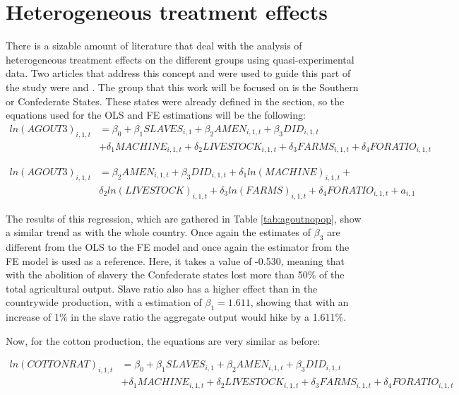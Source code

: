 \documentclass[12pt]{report}
\begin{document}
\section{Heterogeneous treatment effects}
There is a sizable amount of literature that deal with the analysis of heterogeneous treatment effects on the different groups using quasi-experimental data. Two articles that address this concept and were used to guide this part of the study were \cite{felfe2015can} and \cite{NBERw9708}. The group that this work will be focused on is the Southern or Confederate States. These states were already defined in the  section, so the equations used for the OLS and FE estimations will be the following:
\begin{equation}
\begin{split}
ln(AGOUT3)_{i,1,t} &=\beta_{0}+\beta_{1}SLAVES_{i,1}+\beta_{2}AMEN_{i,1,t}+\beta_{3}DID_{i,1,t}
\\
&+\delta_{1}MACHINE_{i,1,t}+\delta_{2}LIVESTOCK_{i,1,t}+\delta_{3}FARMS_{i,1,t}+\delta_{4}FORATIO_{i,1,t}
\end{split}
\end{equation}

\begin{equation}
\begin{split}
ln(AGOUT3)_{i,1,t} &=\beta_{2}AMEN_{i,1,t}+\beta_{3}DID_{i,1,t}+\delta_{1}ln(MACHINE)_{i,1,t}+
\\
&\delta_{2}ln(LIVESTOCK)_{i,1,t}+\delta_{3}ln(FARMS)_{i,1,t}+\delta_{4}FORATIO_{i,1,t} + a_{i,1}
\end{split}
\end{equation}


The results of this regression, which are gathered in Table \ref{tab:agoutnopop}, show a similar trend as with the whole country. Once again the estimates of $\beta_{3}$ are different from the OLS to the FE model and once again the estimator from the FE model is used as a reference. Here, it takes a value of -0.530, meaning that with the abolition of slavery the Confederate states lost more than 50\% of the total agricultural output. Slave ratio also has a higher effect than in the countrywide production, with a estimation of $\beta_{1}=1.611$, showing that with an increase of 1\% in the slave ratio the aggregate output would hike by a 1.611\%.

Now, for the cotton production, the equations are very similar as before:

\begin{equation}
\begin{split}
ln(COTTONRAT)_{i,1,t} &=\beta_{0}+\beta_{1}SLAVES_{i,1}+\beta_{2}AMEN_{i,1,t}+\beta_{3}DID_{i,1,t}
\\
&+\delta_{1}MACHINE_{i,1,t}+\delta_{2}LIVESTOCK_{i,1,t}+\delta_{3}FARMS_{i,1,t}+\delta_{4}FORATIO_{i,1,t}
\end{split}
\end{equation}
\end{document}
